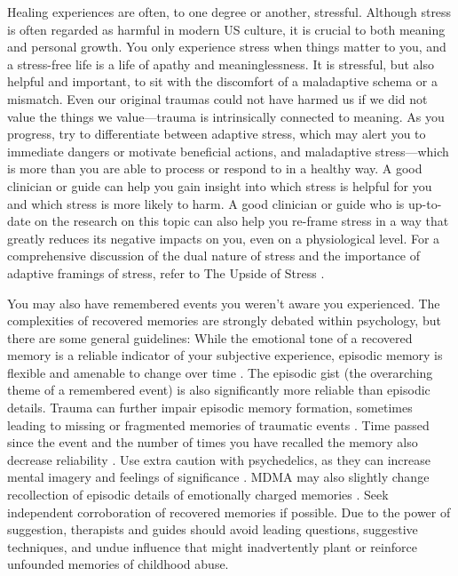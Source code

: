 \documentclass[12pt,letterpaper]{article}
\begin{document}
Healing experiences are often, to one degree or another, stressful. Although stress is often regarded as harmful in modern US culture, it is crucial to both meaning and personal growth. You only experience stress when things matter to you, and a stress-free life is a life of apathy and meaninglessness. It is stressful, but also helpful and important, to sit with the discomfort of a maladaptive schema or a mismatch. Even our original traumas could not have harmed us if we did not value the things we value—trauma is intrinsically connected to meaning. As you progress, try to differentiate between adaptive stress, which may alert you to immediate dangers or motivate beneficial actions, and maladaptive stress—which is more than you are able to process or respond to in a healthy way. A good clinician or guide can help you gain insight into which stress is helpful for you and which stress is more likely to harm. A good clinician or guide who is up-to-date on the research on this topic can also help you re-frame stress in a way that greatly reduces its negative impacts on you, even on a physiological level. For a comprehensive discussion of the dual nature of stress and the importance of adaptive framings of stress, refer to The Upside of Stress \cite{mcgonigalStress}.

You may also have remembered events you weren't aware you experienced. The complexities of recovered memories are strongly debated within psychology, but there are some general guidelines: While the emotional tone of a recovered memory is a reliable indicator of your subjective experience, episodic memory is flexible and amenable to change over time \cite{reynaFuzzyTrace}. The episodic gist (the overarching theme of a remembered event) is also significantly more reliable than episodic details. Trauma can further impair episodic memory formation, sometimes leading to missing or fragmented memories of traumatic events \cite{vanderKolkBody}. Time passed since the event and the number of times you have recalled the memory also decrease reliability \cite{laneReconsolidation}. Use extra caution with psychedelics, as they can increase mental imagery and feelings of significance \cite{griffithsSignificance,araujoImagery}. MDMA may also slightly change recollection of episodic details of emotionally charged memories \cite{dossRecollection}. Seek independent corroboration of recovered memories if possible. Due to the power of suggestion, therapists and guides should avoid leading questions, suggestive techniques, and undue influence that might inadvertently plant or reinforce unfounded memories of childhood abuse.
\end{document}
